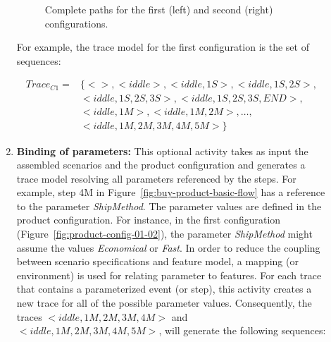 \documentclass{acm_proc_article-sp}
\begin{document}
\begin{description}
\begin{enumerate}
 
\begin{figure}[t]
\begin{center}
\begin{tiny}
\begin{xy}
\end{xy}
\end{tiny}
\caption{Complete paths for the first (left) and second (right) configurations.}
\label{fig:complete-paths}
\end{center}
\end{figure}

For example, the trace model for the first configuration is the set of sequences:

\begin{small}
\begin{eqnarray*}
Trace_{C1} = & \{<>, <iddle>, <iddle, 1S>, <iddle, 1S,2S>, \\ 
                    & <iddle,1S,2S,3S>,  <iddle,1S,2S,3S,END>, \\ 
                    & <iddle, 1M>, <iddle, 1M,2M>, \ldots, \\ 
                    & <iddle, 1M, 2M,3M,4M,5M> \}
\end{eqnarray*}
\end{small}
 
 \item {\bf Binding of parameters:}  This optional activity takes as input the assembled scenarios and the product configuration and generates 
 a trace model resolving all parameters referenced by the steps. For example, step 4M in Figure~\ref{fig:buy-product-basic-flow} has a reference 
 to the parameter \emph{ShipMethod}. The parameter values are defined in the product configuration. For instance, in the 
 first configuration (Figure~\ref{fig:product-config-01-02}), the parameter \emph{ShipMethod} might assume the values \emph{Economical} or 
 \emph{Fast}. In order to reduce the coupling between scenario specifications and feature model, a mapping (or environment) is used for relating 
 parameter to features. For each trace that contains a parameterized event (or step), this activity creates a new trace for all of the possible parameter 
 values. Consequently, the traces $<iddle,1M,2M,3M,4M>$ and $<iddle, 1M, 2M, 3M, 4M, 5M>$, will generate the following sequences:
 

\end{enumerate}
\end{description}
\end{document}
